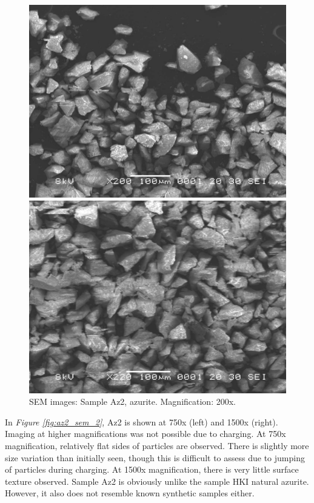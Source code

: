 \begin{figure}[H]
\centering
\begin{minipage}{.45\textwidth}
  \centering
  \includegraphics[width=\linewidth]{Az2_x200_1_240221}
\end{minipage}
\begin{minipage}{.45\textwidth}
  \centering
  \includegraphics[width=\linewidth]{Az2_x200_2_240221}
\end{minipage}
\caption[SEM images: Sample Az2, azurite]{SEM images: Sample Az2, azurite. Magnification: 200x.}
\label{fig:az2_sem_1}
\end{figure}

In \textit{Figure \ref{fig:az2_sem_2}}, Az2 is shown at 750x (left) and 1500x (right). Imaging at higher magnifications was not possible due to charging. At 750x magnification, relatively flat sides of particles are observed. There is slightly more size variation than initially seen, though this is difficult to assess due to jumping of particles during charging. At 1500x magnification, there is very little surface texture observed. Sample Az2 is obviously unlike the sample HKI natural azurite. However, it also does not resemble known synthetic samples either. 

